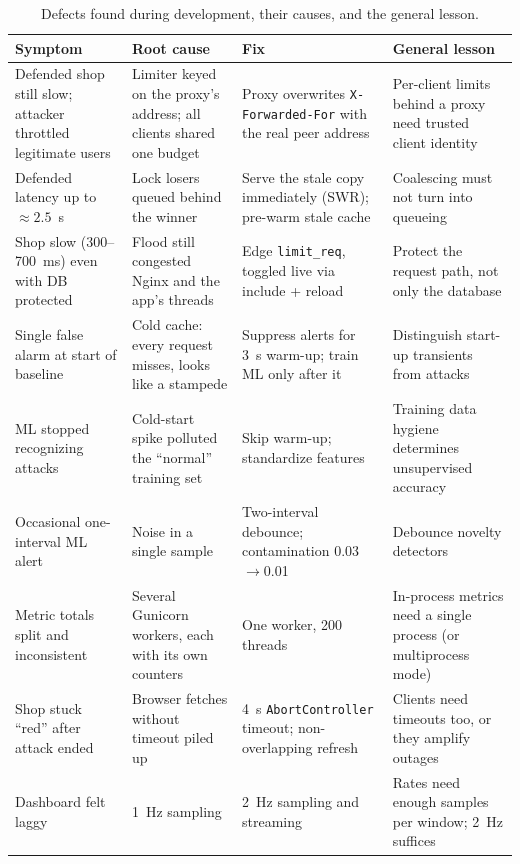 \begin{table}[t]
\centering
\caption{Defects found during development, their causes, and the general lesson.}
\label{tab:bugs}
\footnotesize
\begin{tabularx}{\linewidth}{@{}L{2.9cm}L{3.3cm}L{3.3cm}Y@{}}
\toprule
Symptom & Root cause & Fix & General lesson \\
\midrule
Defended shop still slow; attacker throttled legitimate users & Limiter keyed on the proxy's address; all clients shared one budget & Proxy overwrites \texttt{X-Forwarded-For} with the real peer address & Per-client limits behind a proxy need trusted client identity \\
Defended latency up to ${\approx}2.5$~s & Lock losers queued behind the winner & Serve the stale copy immediately (SWR); pre-warm stale cache & Coalescing must not turn into queueing \\
Shop slow (300--700~ms) even with DB protected & Flood still congested Nginx and the app's threads & Edge \texttt{limit\_req}, toggled live via include + reload & Protect the request path, not only the database \\
Single false alarm at start of baseline & Cold cache: every request misses, looks like a stampede & Suppress alerts for 3~s warm-up; train ML only after it & Distinguish start-up transients from attacks \\
ML stopped recognizing attacks & Cold-start spike polluted the ``normal'' training set & Skip warm-up; standardize features & Training data hygiene determines unsupervised accuracy \\
Occasional one-interval ML alert & Noise in a single sample & Two-interval debounce; contamination 0.03$\rightarrow$0.01 & Debounce novelty detectors \\
Metric totals split and inconsistent & Several Gunicorn workers, each with its own counters & One worker, 200 threads & In-process metrics need a single process (or multiprocess mode) \\
Shop stuck ``red'' after attack ended & Browser fetches without timeout piled up & 4~s \texttt{AbortController} timeout; non-overlapping refresh & Clients need timeouts too, or they amplify outages \\
Dashboard felt laggy & 1~Hz sampling & 2~Hz sampling and streaming & Rates need enough samples per window; 2~Hz suffices \\
\bottomrule
\end{tabularx}
\end{table}

